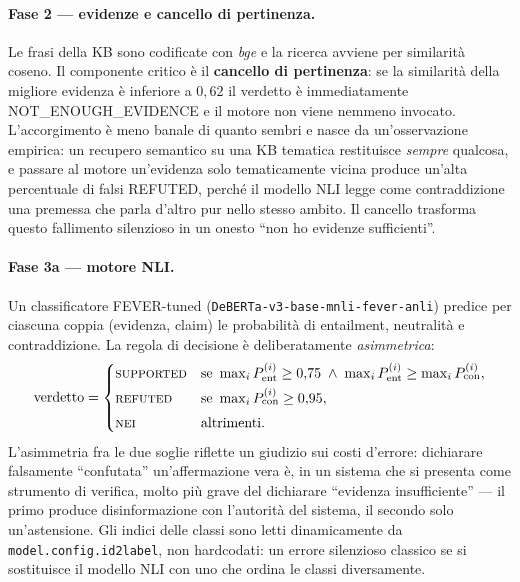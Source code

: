\documentclass[11pt,a4paper]{report}
\begin{document}
\paragraph{Fase 2 --- evidenze e cancello di pertinenza.} Le frasi della KB sono codificate con
\emph{bge} e la ricerca avviene per similarità coseno. Il componente critico è il
\textbf{cancello di pertinenza}: se la similarità della migliore evidenza è inferiore a $0{,}62$
il verdetto è immediatamente NOT\_ENOUGH\_EVIDENCE e il motore non viene nemmeno invocato.
L'accorgimento è meno banale di quanto sembri e nasce da un'osservazione empirica: un recupero
semantico su una KB tematica restituisce \emph{sempre} qualcosa, e passare al motore un'evidenza
solo tematicamente vicina produce un'alta percentuale di falsi REFUTED, perché il modello NLI
legge come contraddizione una premessa che parla d'altro pur nello stesso ambito. Il cancello
trasforma questo fallimento silenzioso in un onesto ``non ho evidenze sufficienti''.

\paragraph{Fase 3a --- motore NLI.} Un classificatore FEVER-tuned
(\texttt{DeBERTa-v3-base-mnli-fever-anli}) predice per ciascuna coppia (evidenza, claim) le
probabilità di entailment, neutralità e contraddizione. La regola di decisione è deliberatamente
\emph{asimmetrica}:
\begin{equation}
\text{verdetto} =
\begin{cases}
\textsc{supported} & \text{se } \max_i P_{\text{ent}}^{(i)} \ge 0{,}75 \;\wedge\;
                                \max_i P_{\text{ent}}^{(i)} \ge \max_i P_{\text{con}}^{(i)},\\[3pt]
\textsc{refuted}   & \text{se } \max_i P_{\text{con}}^{(i)} \ge 0{,}95,\\[3pt]
\textsc{nei}       & \text{altrimenti.}
\end{cases}
\end{equation}
L'asimmetria fra le due soglie riflette un giudizio sui costi d'errore: dichiarare falsamente
``confutata'' un'affermazione vera è, in un sistema che si presenta come strumento di verifica,
molto più grave del dichiarare ``evidenza insufficiente'' --- il primo produce disinformazione con
l'autorità del sistema, il secondo solo un'astensione. Gli indici delle classi sono letti
dinamicamente da \texttt{model.config.id2label}, non hardcodati: un errore silenzioso classico se
si sostituisce il modello NLI con uno che ordina le classi diversamente.
\end{document}
